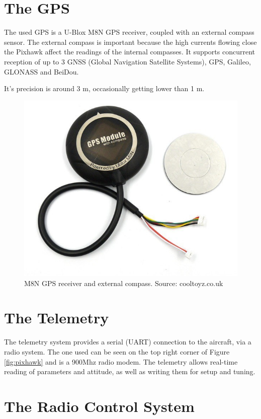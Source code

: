 \section{The GPS}
The used GPS is a U-Blox M8N GPS receiver, coupled with an external compass sensor. The external compass is important because the high currents flowing close the Pixhawk affect the readings of the internal compasses.
%
It supports concurrent reception of up to 3 GNSS (Global Navigation Satellite Systems), GPS, Galileo, GLONASS and BeiDou.

It's precision is around 3 m, occasionally getting lower than 1 m\cite{m8ntest}.

\begin{figure}[H]
\centering
  \includegraphics[width=0.8\linewidth]{figs/m8n.jpg}
  \caption{M8N GPS receiver and external compass. Source: cooltoyz.co.uk}
  \label{fig:m8n}
\end{figure}


\section{The Telemetry}

The telemetry system provides a serial (UART) connection to the aircraft, via a radio system.
%
The one used can be seen on the top right corner of Figure \ref{fig:pixhawk} and is a 900Mhz radio modem.
%
The telemetry allows real-time reading of parameters and attitude, as well as writing them for setup and tuning.

\section{The Radio Control System}

